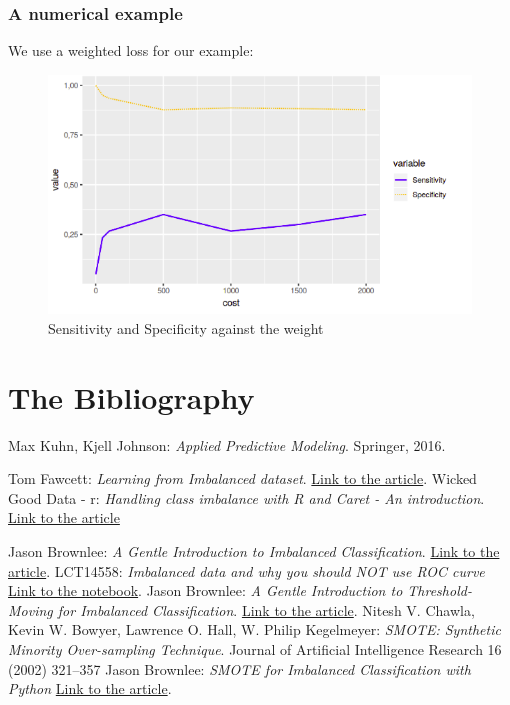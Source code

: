 \documentclass[9pt]{beamer}
\begin{document}
\begin{frame}
\frametitle{A numerical example}
We use a weighted loss for our example:
\begin{figure}[ht]
\includegraphics[scale=0.50]{images/weightplot.png}
\caption{Sensitivity and Specificity against the weight}
\end{figure}

\end{frame}
\section{The Bibliography}
\begin{thebibliography}{9}
Max Kuhn, Kjell Johnson: \textit{Applied Predictive Modeling}. Springer, 2016.

Tom Fawcett: \textit{Learning from Imbalanced dataset}. \href{https://www.svds.com/learning-imbalanced-classes/}{Link to the article}.
Wicked Good Data - r: \textit{Handling class imbalance with R and Caret - An introduction}. \href{https://www.r-bloggers.com/2016/12/handling-class-imbalance-with-r-and-caret-an-introduction/}{Link to the article}

Jason Brownlee: \textit{A Gentle Introduction to Imbalanced Classification}. \href{https://machinelearningmastery.com/what-is-imbalanced-classification/}{Link to the article}.
 LCT14558: \textit{Imbalanced data and why you should NOT use ROC curve} \href{https://www.kaggle.com/lct14558/imbalanced-data-why-you-should-not-use-roc-curve}{Link to the notebook}.
Jason Brownlee: \textit{A Gentle Introduction to Threshold-Moving for Imbalanced Classification}. \href{https://machinelearningmastery.com/threshold-moving-for-imbalanced-classification/}{Link to the article}.
Nitesh V. Chawla, Kevin W. Bowyer, Lawrence O. Hall, W. Philip Kegelmeyer: \textit{SMOTE: Synthetic Minority Over-sampling Technique}. Journal of Artificial Intelligence Research 16 (2002) 321–357
 Jason Brownlee: \textit{SMOTE for Imbalanced Classification with Python} \href{https://machinelearningmastery.com/smote-oversampling-for-imbalanced-classification/}{Link to the article}.



\end{thebibliography}
\end{document}
